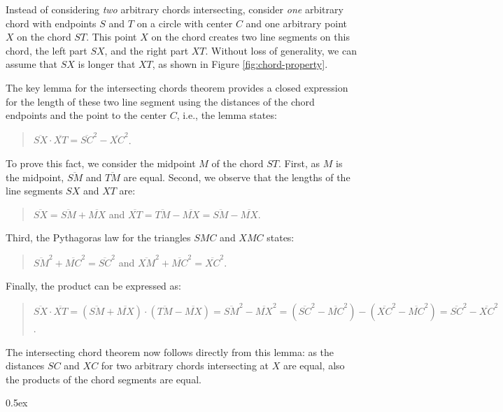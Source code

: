 \documentclass[11pt,a4paper]{article}
\newcommand{\length}[1]{\overline{#1}}
\begin{document}
Instead of considering \emph{two} arbitrary chords intersecting, consider 
\emph{one} arbitrary chord with endpoints $S$ and $T$ on a circle with center $C$
and one arbitrary point $X$ on the chord $ST$.
This point $X$ on the chord creates two line segments on this chord, the left part $SX$, and
the right part $XT$. Without loss of generality, we can assume that $SX$ is longer that $XT$,
as shown in Figure \ref{fig:chord-property}.

The key lemma for the intersecting chords theorem provides 
a closed expression for the length of these two line segment using
the distances of the chord endpoints and the point to the center $C$, i.e.,
the lemma states:
\begin{quote}
$\length{SX} \cdot \length{XT} = \length{SC} ^ 2 - \length{XC} ^ 2$.
\end{quote}
To prove this fact, we consider the midpoint $M$ of the chord $ST$.
First, as $M$ is the midpoint, $\length{SM}$ and $\length{TM}$ are equal.
Second, we observe that the lengths of the line segments $SX$ and $XT$
are: 
\begin{quote}
$\length{SX} = \length{SM} + \length{MX}$ and
$\length{XT} = \length{TM} - \length{MX} = \length{SM} - \length{MX}$.
\end{quote}
Third, the Pythagoras law for the triangles $SMC$ and $XMC$ states:
\begin{quote}
$\length{SM} ^ 2 + \length{MC} ^ 2 = \length{SC} ^ 2$ and
$\length{XM} ^ 2 + \length{MC} ^ 2 = \length{XC} ^ 2$.
\end{quote}
Finally, the product can be expressed as:
\begin{quote}
$\length{SX} \cdot \length{XT} = (\length{SM} + \length{MX}) \cdot (\length{TM} - \length{MX}) =
\length{SM} ^ 2 - \length{MX} ^ 2 = (\length{SC} ^ 2 - \length{MC} ^ 2) - (\length{XC} ^ 2 - \length{MC} ^ 2) =
\length{SC} ^ 2 - \length{XC} ^ 2$.
\end{quote}
The intersecting chord theorem now follows directly
from this lemma:
as the distances $SC$ and $XC$ for two arbitrary chords
intersecting at $X$ are equal, also the products
of the chord segments are equal.

\parindent 0pt\parskip 0.5ex



\nocite{*}



\end{document}
